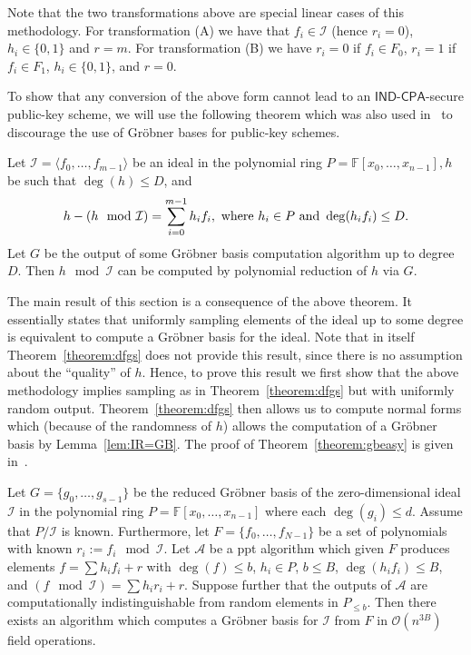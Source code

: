 \documentclass[draft]{llncs}
\newcommand{\ring}[1]{\mathbb{#1}}
\newcommand{\F}{\ensuremath{\ring{F}}\xspace}
\newcommand{\ideal}[1]{\ensuremath{\langle #1 \rangle}\xspace}
\newcommand{\I}{\ensuremath{\mathcal{I}}\xspace}
\newcommand{\ord}[1]{\ensuremath{\mathcal{O}\!\left(#1\right)}}
\newcommand{\A}{\ensuremath{\mathcal{A}}\xspace}
\newcommand{\IND}{\mathsf{IND}}
\newcommand{\CPA}{\mathsf{CPA}}
\begin{document}
Note that the two transformations above are special linear cases of this methodology. For transformation (A) we have that $f_i \in \I$ (hence $r_i = 0$), $h_i \in \{ 0,1 \}$ and $r = m$. For transformation (B) we have $r_i = 0$ if $f_i \in F_0$, $r_i = 1$ if $f_i \in F_1$, $h_i \in \{ 0,1 \}$, and $r=0$.

To show that any conversion of the above form cannot lead to an $\IND\mbox{-}\CPA$-secure public-key scheme, we will use the following theorem which was also used in~\cite{DBLP:journals/jsc/BarkeeCEMR94} to discourage the use of Gröbner bases for public-key schemes.
\begin{theorem} \label{theorem:dfgs}
Let $\I = \ideal{f_0,\dots, f_{m-1}}$ be an ideal in the polynomial ring $P = \F[x_0,\dots,x_{n-1}], h$ be such that $\deg(h) \leq D$, and $$h - (h \mod \I) = \sum_{i=0}^{m-1}h_if_i, \textnormal{ where } h_i \in P \textnormal{ and } \deg(h_i f_i ) \leq D.$$ Let $G$ be the output of some Gröbner basis computation algorithm up to degree $D$. Then $h \!\mod \I$ can be computed by polynomial reduction of $h$ via $G$.
\end{theorem}
The main result of this section is a consequence of the above theorem. It essentially states that uniformly sampling elements of the ideal up to some degree is equivalent to compute a Gröbner basis for the ideal. Note that in itself Theorem~\ref{theorem:dfgs} does not provide this result, since there is no assumption about the ``quality'' of $h$. Hence, to prove this result we first show that the above methodology implies sampling as in Theorem~\ref{theorem:dfgs} but with uniformly random output. Theorem~\ref{theorem:dfgs} then allows us to compute normal forms which (because of the randomness of $h$) allows the computation of a Gröbner basis by Lemma~\ref{lem:IR=GB}. The proof of Theorem~\ref{theorem:gbeasy} is given in~\cite{full}.
\begin{theorem} \label{theorem:gbeasy}
Let $G = \{ g_0,\dots,g_{s-1} \}$ be the reduced Gröbner basis of the zero-dim\-ensional ideal $\I$ in the polynomial ring $P = \F[x_0,\dots,x_{n-1}]$ where each $\deg(g_i) \leq d$. Assume that $P/\I$ is known. Furthermore, let $F = \{ f_0,\dots, f_{N-1} \}$ be a set of polynomials with known $r_i := f_i \mod \I$. Let $\A$ be a ppt algorithm which given $F$ produces elements $f = \sum h_if_i + r$ with $\deg(f) \leq b$, $h_i \in P$, $b\leq B$, $\deg(h_if_i) \leq B$, and $(f \mod \I) = \sum h_ir_i + r$. Suppose further that the outputs of $\A$ are computationally indistinguishable from random elements in $P_{\leq b}$. Then there exists an algorithm which computes a Gröbner basis for $\I$ from $F$ in $\ord{n^{3B}}$ field operations.
\end{theorem}
\end{document}
